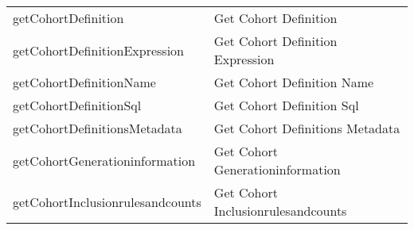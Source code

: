 \documentclass[
]{article}
\begin{document}
\begin{longtable}[]{@{}ll@{}}
\begin{minipage}[t]{0.46\columnwidth}\raggedright
getCohortDefinition\strut
\end{minipage} & \begin{minipage}[t]{0.48\columnwidth}\raggedright
Get Cohort Definition\strut
\end{minipage}\tabularnewline
\begin{minipage}[t]{0.46\columnwidth}\raggedright
getCohortDefinitionExpression\strut
\end{minipage} & \begin{minipage}[t]{0.48\columnwidth}\raggedright
Get Cohort Definition Expression\strut
\end{minipage}\tabularnewline
\begin{minipage}[t]{0.46\columnwidth}\raggedright
getCohortDefinitionName\strut
\end{minipage} & \begin{minipage}[t]{0.48\columnwidth}\raggedright
Get Cohort Definition Name\strut
\end{minipage}\tabularnewline
\begin{minipage}[t]{0.46\columnwidth}\raggedright
getCohortDefinitionSql\strut
\end{minipage} & \begin{minipage}[t]{0.48\columnwidth}\raggedright
Get Cohort Definition Sql\strut
\end{minipage}\tabularnewline
\begin{minipage}[t]{0.46\columnwidth}\raggedright
getCohortDefinitionsMetadata\strut
\end{minipage} & \begin{minipage}[t]{0.48\columnwidth}\raggedright
Get Cohort Definitions Metadata\strut
\end{minipage}\tabularnewline
\begin{minipage}[t]{0.46\columnwidth}\raggedright
getCohortGenerationinformation\strut
\end{minipage} & \begin{minipage}[t]{0.48\columnwidth}\raggedright
Get Cohort Generationinformation\strut
\end{minipage}\tabularnewline
\begin{minipage}[t]{0.46\columnwidth}\raggedright
getCohortInclusionrulesandcounts\strut
\end{minipage} & \begin{minipage}[t]{0.48\columnwidth}\raggedright
Get Cohort Inclusionrulesandcounts\strut
\end{minipage}\tabularnewline

\end{longtable}
\end{document}
